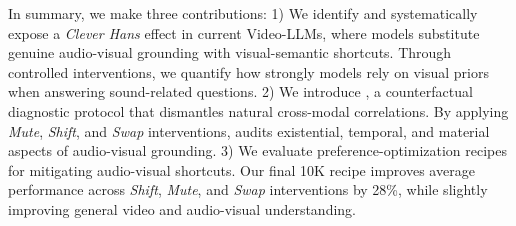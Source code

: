 
In summary, we make three contributions:
1) We identify and systematically expose a \textit{Clever Hans} effect in current Video-LLMs, where models substitute genuine audio-visual grounding with visual-semantic shortcuts. Through controlled interventions, we quantify how strongly models rely on visual priors when answering sound-related questions.
2) We introduce \Thud, a counterfactual diagnostic protocol that dismantles natural cross-modal correlations. By applying \textit{Mute}, \textit{Shift}, and \textit{Swap} interventions, \Thud{} audits existential, temporal, and material aspects of audio-visual grounding.
3) We evaluate preference-optimization recipes for mitigating audio-visual shortcuts. Our final 10K recipe improves average performance across \textit{Shift}, \textit{Mute}, and \textit{Swap} interventions by 28\%, while slightly improving general video and audio-visual understanding.

    
    
